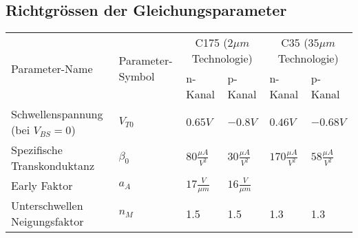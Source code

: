 \subsection{Richtgrössen der Gleichungsparameter}
\begin{tabular}{|l|l|l|l|l|l|}
	\hline
	\multirow{2}{*}{Parameter-Name}			& \multirow{2}{*}{Parameter-Symbol}	& \multicolumn{2}{c|}{C175 ($2\mu m$ Technologie)}	& \multicolumn{2}{c|}{C35 ($35\mu m$ Technologie)}
	\\ \cline{3-6}
											&					& n-Kanal				& p-Kanal									& n-Kanal					& p-Kanal
	\\ \hline 			
	Schwellenspannung (bei $V_{BS} = 0$)	& $V_{T0}$			& $0.65V$				& $-0.8V$									& $0.46V$					& $-0.68V$
	\\ \hline
	Spezifische Transkonduktanz				& $\beta_0$			& $80\frac{\mu A}{V^2}$	& $30 \frac{\mu A}{V^2}$					& $170 \frac{\mu A}{V^2}$	& $58 \frac{\mu A}{V^2}$
	\\ \hline
	Early Faktor							& $a_A$				& $17 \frac{V}{\mu m}$	& $16 \frac{V}{\mu m}$						&							&
	\\ \hline
	Unterschwellen Neigungsfaktor			& $n_M$				& 1.5					& 1.5										& 1.3						& 1.3
	\\ \hline		
\end{tabular}


